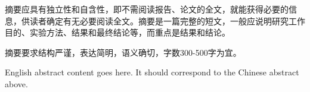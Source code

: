 \documentclass[
    degree=bachelor,
    StudentName=姓名,
    StudentID=学号,
    AdvisorName=指导教师,
    Major=专业,
    Department=某某学院,
    SubmitYear=2022,
    SubmitMonth=5,
    Title=论文中文题目,
    TitleEng={Research on Some Topic}
]{cauc_thesis}
\begin{document}
\frontmatter

\makecover

\begin{abstract-zh}
    摘要应具有独立性和自含性，即不需阅读报告、论文的全文，就能获得必要的信息，供读者确定有无必要阅读全文。摘要是一篇完整的短文，一般应说明研究工作目的、实验方法、结果和最终结论等，而重点是结果和结论。

    摘要要求结构严谨，表达简明，语义确切，字数300-500字为宜。

\end{abstract-zh}

\begin{abstract-en}
    English abstract content goes here. It should correspond to the Chinese abstract above.

\end{abstract-en}

\makefrontmatter

\mainmatter







\backmatter




\end{document}
